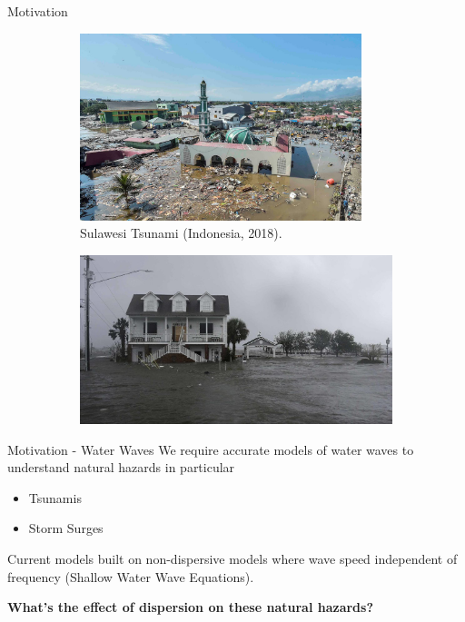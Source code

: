 \documentclass[pdf]{beamer}
\begin{document}
\begin{frame}{Motivation}
\begin{figure}
	\centering
	\begin{subfigure}{0.49\textwidth}
		\includegraphics[width=0.9\textwidth]{./Pics/Web/SualwesiTsunami.jpg}
		\caption{Sulawesi Tsunami (Indonesia, 2018).}
	\end{subfigure}
	\begin{subfigure}{0.49\textwidth}
	\includegraphics[width=1.1\textwidth]{./Pics/Web/HurricaneFlorence.jpg}
	\end{subfigure}
\end{figure}
\end{frame}


\begin{frame}{Motivation - Water Waves}
We require accurate models of water waves to understand natural hazards in particular
\begin{itemize}
	\item Tsunamis
	\item Storm Surges
\end{itemize}
\bigskip
Current models built on non-dispersive models where wave speed independent of frequency (Shallow Water Wave Equations). 
\pause

\bigskip
\textbf{{What's the effect of dispersion on these natural hazards?}}
\end{frame}
\end{document}
